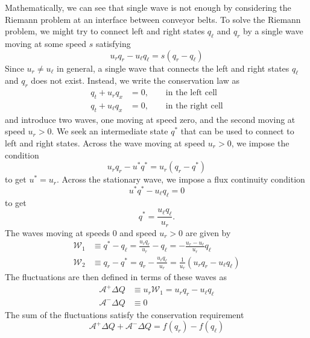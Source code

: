 \documentclass{article}
\begin{document}
Mathematically, we can see that single wave is not enough by considering the Riemann problem at an interface between conveyor belts.   To solve the Riemann problem, we might try to connect left and 
right states $q_\ell$ and $q_r$ by a single wave moving at some speed $s$ satisfying
\begin{equation}
u_r q_r - u_\ell q_\ell = s(q_r - q_\ell)
\end{equation}
Since $u_r \ne u_\ell$ in general, a single wave that connects the left and 
right states $q_\ell$ and $q_r$ does not exist.  Instead, we write the conservation 
law as
\begin{align*}
q_t + u_r q_x & = 0, \qquad \mbox{in the left cell} \\
q_t + u_\ell q_x & = 0, \qquad \mbox{in the right cell}
\end{align*}
and introduce two waves, one moving at speed zero, and the second moving at speed $u_r > 0$.  
We seek an intermediate state $q^*$ that can be used to connect to left and right states.
Across the wave moving at speed $u_r > 0$, we impose the condition
\begin{equation}
u_r q_r - u^* q^* = u_r(q_r - q^*)
\end{equation}
to get $u^* = u_r$.  Across the stationary wave, we impose a flux continuity condition
\begin{equation}
u^* q^* - u_\ell q_\ell = 0
\end{equation}
to get
\begin{equation*}
q^* = \frac{u_\ell q_\ell}{u_r}.
\end{equation*}
The waves moving at speeds 0 and speed $u_r > 0$ are given by
\begin{align*}
\mathcal{W}_1 & \equiv q^* - q_\ell = \frac{u_\ell q_\ell}{u_r} - q_\ell = 
-\frac{u_r - u_\ell}{u_r}q_\ell\\
\mathcal{W}_2 & \equiv q_r - q^* = q_r - \frac{u_\ell q_\ell}{u_r} = 
\frac{1}{u_r}\left(u_r q_r - u_\ell q_\ell\right)
\end{align*}
The fluctuations are then defined in terms of these waves as
\begin{align*}
\mathcal{A}^+ \Delta Q & \equiv u_r \mathcal{W}_1 = u_r q_r - u_\ell q_\ell \\
\mathcal{A}^- \Delta Q & \equiv 0
\end{align*}
The sum of the fluctuations satisfy the conservation requirement
\begin{equation*}
\mathcal{A}^+ \Delta Q + \mathcal{A}^- \Delta Q = f(q_r) - f(q_\ell)
\end{equation*}
\end{document}
